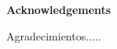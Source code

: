\newpage

\begin{center}
{\bf \Huge Acknowledgements}
\end{center}

\vspace{1cm}
\setlength{\baselineskip}{0.8cm}

Agradecimientos.....
